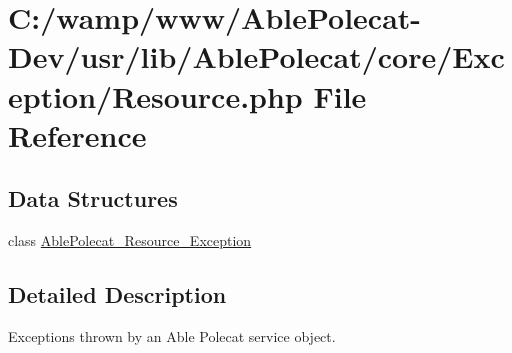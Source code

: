 \hypertarget{_exception_2_resource_8php}{}\section{C\+:/wamp/www/\+Able\+Polecat-\/\+Dev/usr/lib/\+Able\+Polecat/core/\+Exception/\+Resource.php File Reference}
\label{_exception_2_resource_8php}
\subsection*{Data Structures}
\begin{DoxyCompactItemize}
\item 
class \hyperlink{class_able_polecat___resource___exception}{Able\+Polecat\+\_\+\+Resource\+\_\+\+Exception}
\end{DoxyCompactItemize}


\subsection{Detailed Description}
Exceptions thrown by an Able Polecat service object. 